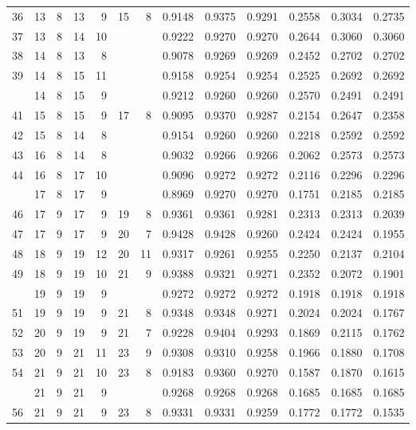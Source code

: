 \begin{Schunk}
\begin{longtable}{rrrrrrrrrrrrr}
36 & 13 & 8 & 13 & 9 & 15 & 8 & 0.9148 & 0.9375 & 0.9291 & 0.2558 & 0.3034 & 0.2735\\
37 & 13 & 8 & 14 & 10 &  &  & 0.9222 & 0.9270 & 0.9270 & 0.2644 & 0.3060 & 0.3060\\
38 & 14 & 8 & 13 & 8 &  &  & 0.9078 & 0.9269 & 0.9269 & 0.2452 & 0.2702 & 0.2702\\
39 & 14 & 8 & 15 & 11 &  &  & 0.9158 & 0.9254 & 0.9254 & 0.2525 & 0.2692 & 0.2692\\
\addlinespace
40 & 14 & 8 & 15 & 9 &  &  & 0.9212 & 0.9260 & 0.9260 & 0.2570 & 0.2491 & 0.2491\\
41 & 15 & 8 & 15 & 9 & 17 & 8 & 0.9095 & 0.9370 & 0.9287 & 0.2154 & 0.2647 & 0.2358\\
42 & 15 & 8 & 14 & 8 &  &  & 0.9154 & 0.9260 & 0.9260 & 0.2218 & 0.2592 & 0.2592\\
43 & 16 & 8 & 14 & 8 &  &  & 0.9032 & 0.9266 & 0.9266 & 0.2062 & 0.2573 & 0.2573\\
44 & 16 & 8 & 17 & 10 &  &  & 0.9096 & 0.9272 & 0.9272 & 0.2116 & 0.2296 & 0.2296\\
\addlinespace
45 & 17 & 8 & 17 & 9 &  &  & 0.8969 & 0.9270 & 0.9270 & 0.1751 & 0.2185 & 0.2185\\
46 & 17 & 9 & 17 & 9 & 19 & 8 & 0.9361 & 0.9361 & 0.9281 & 0.2313 & 0.2313 & 0.2039\\
47 & 17 & 9 & 17 & 9 & 20 & 7 & 0.9428 & 0.9428 & 0.9260 & 0.2424 & 0.2424 & 0.1955\\
48 & 18 & 9 & 19 & 12 & 20 & 11 & 0.9317 & 0.9261 & 0.9255 & 0.2250 & 0.2137 & 0.2104\\
49 & 18 & 9 & 19 & 10 & 21 & 9 & 0.9388 & 0.9321 & 0.9271 & 0.2352 & 0.2072 & 0.1901\\
\addlinespace
50 & 19 & 9 & 19 & 9 &  &  & 0.9272 & 0.9272 & 0.9272 & 0.1918 & 0.1918 & 0.1918\\
51 & 19 & 9 & 19 & 9 & 21 & 8 & 0.9348 & 0.9348 & 0.9271 & 0.2024 & 0.2024 & 0.1767\\
52 & 20 & 9 & 19 & 9 & 21 & 7 & 0.9228 & 0.9404 & 0.9293 & 0.1869 & 0.2115 & 0.1762\\
53 & 20 & 9 & 21 & 11 & 23 & 9 & 0.9308 & 0.9310 & 0.9258 & 0.1966 & 0.1880 & 0.1708\\
54 & 21 & 9 & 21 & 10 & 23 & 8 & 0.9183 & 0.9360 & 0.9270 & 0.1587 & 0.1870 & 0.1615\\
\addlinespace
55 & 21 & 9 & 21 & 9 &  &  & 0.9268 & 0.9268 & 0.9268 & 0.1685 & 0.1685 & 0.1685\\
56 & 21 & 9 & 21 & 9 & 23 & 8 & 0.9331 & 0.9331 & 0.9259 & 0.1772 & 0.1772 & 0.1535\\

\end{longtable}
\end{Schunk}
